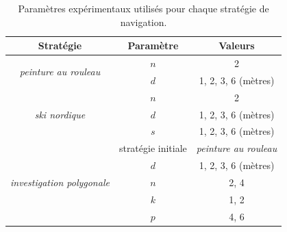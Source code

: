 \documentclass[english,RandD]{rapportPFE}  %
\begin{document}
		\begin{table}[h!]
			\centering
			\begin{tabular}{|c|c|c|}
				\hline
				Stratégie & Paramètre & Valeurs \\
				\hline
				\multirow{2}{*}{\textit{peinture au rouleau}} & $n$ & 2 \\
				& $d$ & 1, 2, 3, 6 (mètres) \\
				\hline
				\multirow{3}{*}{\textit{ski nordique}} & $n$ & 2 \\
				& $d$ & 1, 2, 3, 6 (mètres) \\
				& $s$ & 1, 2, 3, 6 (mètres) \\
				\hline
				\multirow{5}{*}{\textit{investigation polygonale}} & stratégie initiale & \textit{peinture au rouleau} \\
				& $d$ & 1, 2, 3, 6 (mètres) \\
				& $n$ & 2, 4 \\
				& $k$ & 1, 2 \\
				& $p$ & 4, 6 \\
				\hline
			\end{tabular}
			\caption{Paramètres expérimentaux utilisés pour chaque stratégie de navigation.}
			\label{tab:exp_params}
		\end{table}
\end{document}
